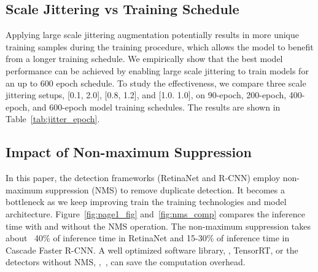 \documentclass[final]{cvpr}
\begin{document}



\subsection{Scale Jittering vs Training Schedule}
Applying large scale jittering augmentation potentially results in more unique training samples during the training procedure, which allows the model to benefit from a longer training schedule. We empirically show that the best model performance can be achieved by enabling large scale jittering to train models for an up to 600 epoch schedule. To study the effectiveness, we compare three scale jittering setups, [0.1, 2.0], [0.8, 1.2], and [1.0. 1.0], on 90-epoch, 200-epoch, 400-epoch, and 600-epoch model training schedules. The results are shown in Table~\ref{tab:jitter_epoch}.

\subsection{Impact of Non-maximum Suppression}
In this paper, the detection frameworks (RetinaNet and R-CNN) employ non-maximum suppression (NMS) to remove duplicate detection. It becomes a bottleneck as we keep improving train the training technologies and model architecture. Figure~\ref{fig:page1_fig} and~\ref{fig:nms_comp} compares the inference time with and without the NMS operation. The non-maximum suppression takes about ~40\% of inference time in RetinaNet and 15-30\% of inference time in Cascade Faster R-CNN. A well optimized software library, \eg, TensorRT, or the detectors without NMS, \eg,~\cite{carion2020endtoend,centernet}, can save the computation overhead.
\end{document}
